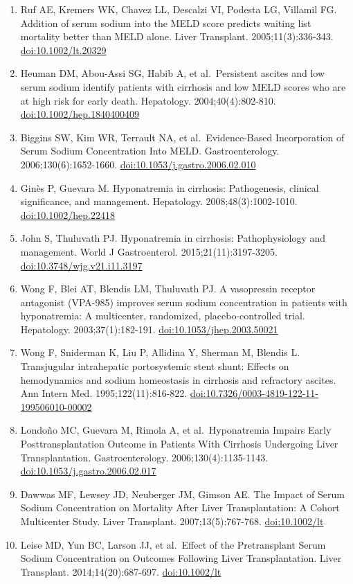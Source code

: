 \documentclass[11pt,english,]{book} %
\begin{document}
\begin{enumerate}
\item
  Ruf AE, Kremers WK, Chavez LL, Descalzi VI, Podesta LG, Villamil FG. Addition of serum sodium into the MELD score predicts waiting list mortality better than MELD alone. Liver Transplant. 2005;11(3):336-343. \url{doi:10.1002/lt.20329}
\item
  Heuman DM, Abou-Assi SG, Habib A, et al.~Persistent ascites and low serum sodium identify patients with cirrhosis and low MELD scores who are at high risk for early death. Hepatology. 2004;40(4):802-810. \url{doi:10.1002/hep.1840400409}
\item
  Biggins SW, Kim WR, Terrault NA, et al.~Evidence-Based Incorporation of Serum Sodium Concentration Into MELD. Gastroenterology. 2006;130(6):1652-1660. \url{doi:10.1053/j.gastro.2006.02.010}
\item
  Ginès P, Guevara M. Hyponatremia in cirrhosis: Pathogenesis, clinical significance, and management. Hepatology. 2008;48(3):1002-1010. \url{doi:10.1002/hep.22418}
\item
  John S, Thuluvath PJ. Hyponatremia in cirrhosis: Pathophysiology and management. World J Gastroenterol. 2015;21(11):3197-3205. \url{doi:10.3748/wjg.v21.i11.3197}
\item
  Wong F, Blei AT, Blendis LM, Thuluvath PJ. A vasopressin receptor antagonist (VPA-985) improves serum sodium concentration in patients with hyponatremia: A multicenter, randomized, placebo-controlled trial. Hepatology. 2003;37(1):182-191. \url{doi:10.1053/jhep.2003.50021}
\item
  Wong F, Sniderman K, Liu P, Allidina Y, Sherman M, Blendis L. Transjugular intrahepatic portosystemic stent shunt: Effects on hemodynamics and sodium homeostasis in cirrhosis and refractory ascites. Ann Intern Med. 1995;122(11):816-822. \url{doi:10.7326/0003-4819-122-11-199506010-00002}
\item
  Londoño MC, Guevara M, Rimola A, et al.~Hyponatremia Impairs Early Posttransplantation Outcome in Patients With Cirrhosis Undergoing Liver Transplantation. Gastroenterology. 2006;130(4):1135-1143. \url{doi:10.1053/j.gastro.2006.02.017}
\item
  Dawwas MF, Lewsey JD, Neuberger JM, Gimson AE. The Impact of Serum Sodium Concentration on Mortality After Liver Transplantation: A Cohort Multicenter Study. Liver Transplant. 2007;13(5):767-768. \url{doi:10.1002/lt}
\item
  Leise MD, Yun BC, Larson JJ, et al.~Effect of the Pretransplant Serum Sodium Concentration on Outcomes Following Liver Transplantation. Liver Transplant. 2014;14(20):687-697. \url{doi:10.1002/lt}

\end{enumerate}
\end{document}
